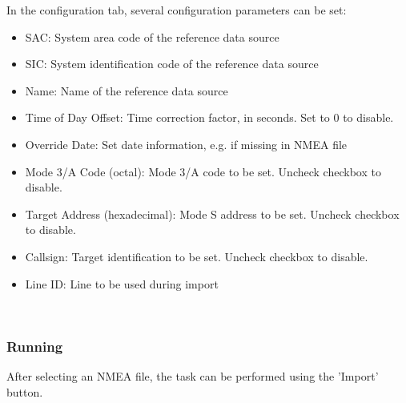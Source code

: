 In the configuration tab, several configuration parameters can be set:

\begin{itemize}
\item SAC: System area code of the reference data source
\item SIC: System identification code of the reference data source
\item Name: Name of the reference data source
\item Time of Day Offset: Time correction factor, in seconds. Set to 0 to disable.
\item Override Date: Set date information, e.g. if missing in NMEA file
\item Mode 3/A Code (octal): Mode 3/A code to be set. Uncheck checkbox to disable.
\item Target Address (hexadecimal): Mode S address to be set. Uncheck checkbox to disable.
\item Callsign: Target identification to be set. Uncheck checkbox to disable.
\item Line ID: Line to be used during import
\end{itemize}
\ \\

\subsubsection{Running}

After selecting an NMEA file, the task can be performed using the 'Import' button.


